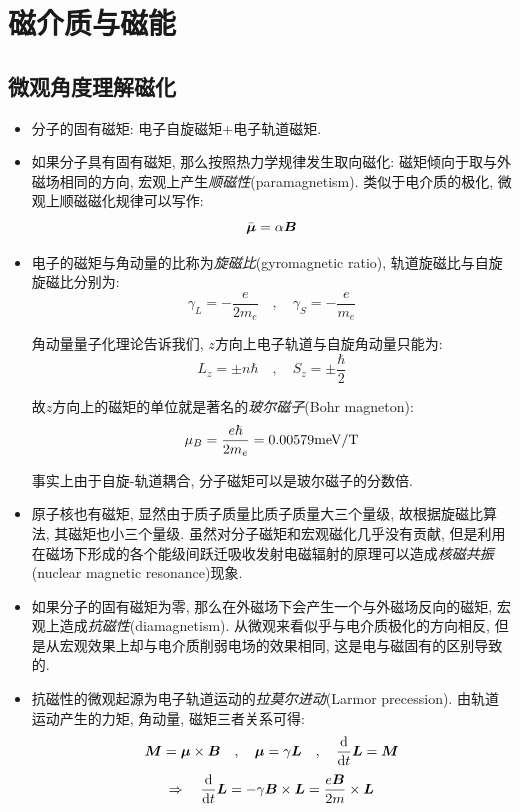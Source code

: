 \npg{-2cm}

\section{磁介质与磁能}

\subsection{微观角度理解磁化}

\begin{itemize}
\item 分子的固有磁矩: 电子自旋磁矩+电子轨道磁矩.
\item 如果分子具有固有磁矩, 那么按照热力学规律发生取向磁化: 磁矩倾向于取与外磁场相同的方向, 宏观上产生\emph{顺磁性}(paramagnetism). 类似于电介质的极化, 微观上顺磁磁化规律可以写作:
\[\bar{\boldsymbol{\mu}}=\alpha \boldsymbol{B}\]
\item 电子的磁矩与角动量的比称为\emph{旋磁比}(gyromagnetic ratio), 轨道旋磁比与自旋旋磁比分别为:
\[\gamma_L=-\frac{e}{2m_e}\quad ,\quad \gamma_S=-\frac{e}{m_e}\]

角动量量子化理论告诉我们, $z$方向上电子轨道与自旋角动量只能为:
\[L_z=\pm n\hbar \quad ,\quad  S_z=\pm \frac{\hbar}{2}\]

故$z$方向上的磁矩的单位就是著名的\emph{玻尔磁子}(Bohr magneton):
\[\mu_B=\frac{e\hbar}{2m_e}=0.00579{\rm meV/T}\]

事实上由于自旋-轨道耦合, 分子磁矩可以是玻尔磁子的分数倍.

\item 原子核也有磁矩, 显然由于质子质量比质子质量大三个量级, 故根据旋磁比算法, 其磁矩也小三个量级. 虽然对分子磁矩和宏观磁化几乎没有贡献, 但是利用在磁场下形成的各个能级间跃迁吸收发射电磁辐射的原理可以造成\emph{核磁共振}(nuclear magnetic resonance)现象.

\item 如果分子的固有磁矩为零, 那么在外磁场下会产生一个与外磁场反向的磁矩, 宏观上造成\emph{抗磁性}(diamagnetism). 从微观来看似乎与电介质极化的方向相反, 但是从宏观效果上却与电介质削弱电场的效果相同, 这是电与磁固有的区别导致的.

\item 抗磁性的微观起源为电子轨道运动的\emph{拉莫尔进动}(Larmor precession). 由轨道运动产生的力矩, 角动量, 磁矩三者关系可得:
\[\boldsymbol{M}=\boldsymbol{\mu}\times \boldsymbol{B}\quad ,\quad  \boldsymbol{\mu}=\gamma \boldsymbol{L}\quad ,\quad  \frac{\textrm{d}}{\textrm{d} t}\boldsymbol{L}=\boldsymbol{M}\]
\[\Rightarrow \quad  \frac{\textrm{d}}{\textrm{d} t}\boldsymbol{L}=-\gamma \boldsymbol{B}\times \boldsymbol{L}=\frac{e\boldsymbol{B}}{2m}\times \boldsymbol{L}\]


\end{itemize}

